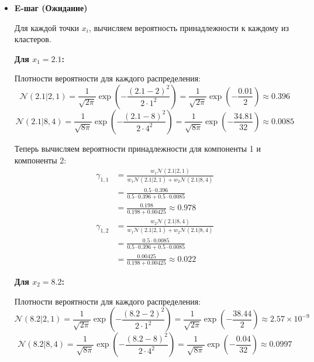 \begin{itemize}
    \item \textbf{E-шаг (Ожидание)}

    Для каждой точки $x_i$, вычисляем вероятность принадлежности к каждому из кластеров.

    \textbf{Для $x_1 = 2.1$:}

    Плотности вероятности для каждого распределения:
    \[
    \mathcal{N}(2.1 | 2, 1) = \frac{1}{\sqrt{2\pi}} \exp\left( -\frac{(2.1 - 2)^2}{2 \cdot 1^2} \right) = \frac{1}{\sqrt{2\pi}} \exp\left( -\frac{0.01}{2} \right) \approx 0.396
    \]
    \[
    \mathcal{N}(2.1 | 8, 4) = \frac{1}{\sqrt{8\pi}} \exp\left( -\frac{(2.1 - 8)^2}{2 \cdot 4^2} \right) = \frac{1}{\sqrt{8\pi}} \exp\left( -\frac{34.81}{32} \right) \approx 0.0085
    \]

    Теперь вычисляем вероятности принадлежности для компоненты 1 и компоненты 2:
    \begin{align*}
    \gamma_{1,1} &= \frac{w_1 \mathcal{N}(2.1 | 2, 1)}{w_1 \mathcal{N}(2.1 | 2, 1) + w_2 \mathcal{N}(2.1 | 8, 4)} \\
    &= \frac{0.5 \cdot 0.396}{0.5 \cdot 0.396 + 0.5 \cdot 0.0085} \\
    &= \frac{0.198}{0.198 + 0.00425} \approx 0.978
    \end{align*}
    \begin{align*}
    \gamma_{1,2} &= \frac{w_2 \mathcal{N}(2.1 | 8, 4)}{w_1 \mathcal{N}(2.1 | 2, 1) + w_2 \mathcal{N}(2.1 | 8, 4)} \\
    &= \frac{0.5 \cdot 0.0085}{0.5 \cdot 0.396 + 0.5 \cdot 0.0085} \\
    &= \frac{0.00425}{0.198 + 0.00425} \approx 0.022
    \end{align*}

    \textbf{Для $x_2 = 8.2$:}

    Плотности вероятности для каждого распределения:
    \[
    \mathcal{N}(8.2 | 2, 1) = \frac{1}{\sqrt{2\pi}} \exp\left( -\frac{(8.2 - 2)^2}{2 \cdot 1^2} \right) = \frac{1}{\sqrt{2\pi}} \exp\left( -\frac{38.44}{2} \right) \approx 2.57 \times 10^{-9}
    \]
    \[
    \mathcal{N}(8.2 | 8, 4) = \frac{1}{\sqrt{8\pi}} \exp\left( -\frac{(8.2 - 8)^2}{2 \cdot 4^2} \right) = \frac{1}{\sqrt{8\pi}} \exp\left( -\frac{0.04}{32} \right) \approx 0.0997
    \]


\end{itemize}

